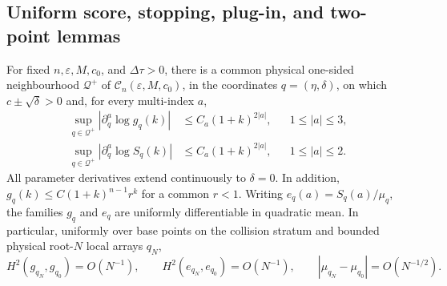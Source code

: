 \subsection{Uniform score, stopping, plug-in, and two-point lemmas}
\label{subsec:singular-uniform-lemmas-main}

\begin{lemma}
\label{lem:uniform-sampled-bin-tail-score-main}
For fixed \(n,\varepsilon,M,c_0\), and \(\Delta\tau>0\), there is a common
physical one-sided neighbourhood \(\mathcal Q^+\) of
\(\mathcal C_n(\varepsilon,M,c_0)\), in the coordinates
\(q=(\eta,\delta)\), on which \(c\pm\sqrt\delta>0\) and, for every
multi-index \(a\),
\[
\begin{aligned}
 \sup_{q\in\mathcal Q^+}|\partial_q^a\log g_q(k)|
 &\le C_a(1+k)^{2|a|},&& 1\le|a|\le3,\\
 \sup_{q\in\mathcal Q^+}|\partial_q^a\log S_q(k)|
 &\le C_a(1+k)^{2|a|},&& 1\le|a|\le2.
\end{aligned}
\tag{U1}\label{eq:u1-supp}
\]
All parameter derivatives extend continuously to \(\delta=0\).  In addition,
\(g_q(k)\le C(1+k)^{n-1}r^k\) for a common \(r<1\).
Writing \(e_q(a)=S_q(a)/\mu_q\), the families \(g_q\) and \(e_q\) are
uniformly differentiable in quadratic mean.  In particular, uniformly over
base points on the collision stratum and bounded physical root-\(N\) local
arrays \(q_N\),
\[
 H^2(g_{q_N},g_{q_0})=O(N^{-1}),\qquad
 H^2(e_{q_N},e_{q_0})=O(N^{-1}),\qquad
 |\mu_{q_N}-\mu_{q_0}|=O(N^{-1/2}).
\tag{U1a}\label{eq:u1a-supp}
\]
\end{lemma}

